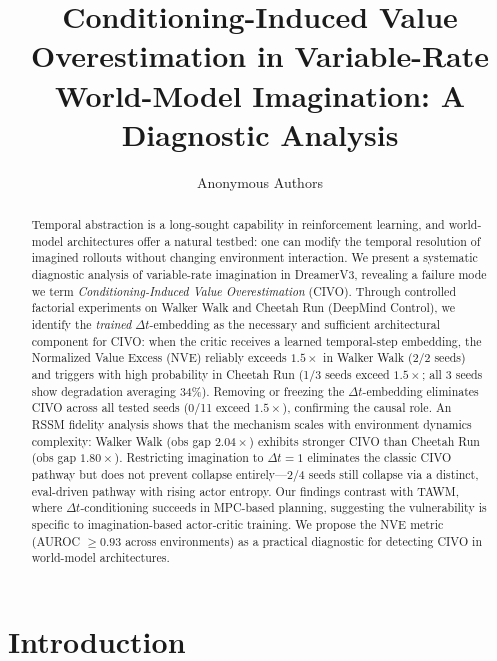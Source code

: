\documentclass[10pt,letterpaper]{article}
\title{Conditioning-Induced Value Overestimation in Variable-Rate\\World-Model Imagination: A Diagnostic Analysis}
\author{
  Anonymous Authors
}
\date{}
\newcommand{\dt}{\Delta t}
\begin{document}
\maketitle

\begin{abstract}
Temporal abstraction is a long-sought capability in reinforcement learning, and world-model architectures offer a natural testbed: one can modify the temporal resolution of imagined rollouts without changing environment interaction.
We present a systematic diagnostic analysis of variable-rate imagination in DreamerV3, revealing a failure mode we term \emph{Conditioning-Induced Value Overestimation} (CIVO).
Through controlled factorial experiments on Walker Walk and Cheetah Run (DeepMind Control), we identify the \emph{trained} $\dt$-embedding as the necessary and sufficient architectural component for CIVO: when the critic receives a learned temporal-step embedding, the Normalized Value Excess (NVE) reliably exceeds $1.5\times$ in Walker Walk (2/2 seeds) and triggers with high probability in Cheetah Run (1/3 seeds exceed $1.5\times$; all 3 seeds show degradation averaging 34\%).
Removing or freezing the $\dt$-embedding eliminates CIVO across all tested seeds (0/11 exceed $1.5\times$), confirming the causal role.
An RSSM fidelity analysis shows that the mechanism scales with environment dynamics complexity: Walker Walk (obs gap $2.04\times$) exhibits stronger CIVO than Cheetah Run (obs gap $1.80\times$).
Restricting imagination to $\dt{=}1$ eliminates the classic CIVO pathway but does not prevent collapse entirely---2/4 seeds still collapse via a distinct, eval-driven pathway with rising actor entropy.
Our findings contrast with TAWM, where $\dt$-conditioning succeeds in MPC-based planning, suggesting the vulnerability is specific to imagination-based actor-critic training.
We propose the NVE metric (AUROC $\geq 0.93$ across environments) as a practical diagnostic for detecting CIVO in world-model architectures.
\end{abstract}

\section{Introduction}
\end{document}
